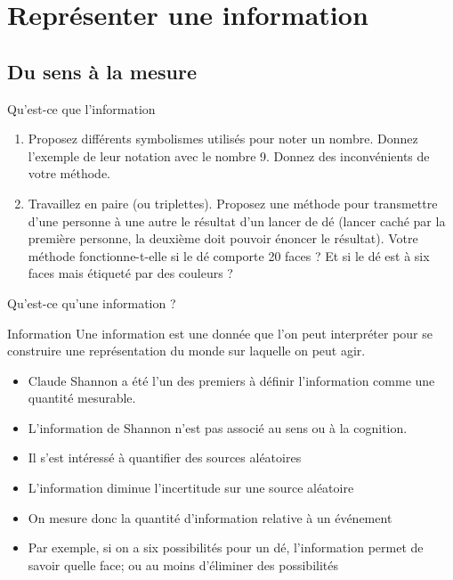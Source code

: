 \section{Représenter une information}
\subsection{Du sens à la mesure}
\begin{exercice}
  \begin{exercicelet}{Qu'est-ce que l'information}
    \begin{enumerate}
    \item Proposez différents symbolismes utilisés pour noter un
      nombre. Donnez l'exemple de leur notation avec le nombre 9. Donnez des
      inconvénients de votre méthode.
    \item Travaillez en paire (ou triplettes). Proposez une méthode pour
      transmettre d'une personne à une autre le résultat d'un lancer de dé
      (lancer caché par la première personne, la deuxième doit pouvoir énoncer
      le résultat). Votre méthode fonctionne-t-elle si le dé comporte 20
      faces ? Et si le dé est à six faces mais étiqueté par des couleurs ?
    \end{enumerate}
  \end{exercicelet}
\end{exercice}
\begin{frame}{Qu'est-ce qu'une information ?}
  \begin{block}{Information}
    Une information est une donnée que l'on peut interpréter pour se
    construire une représentation du monde sur laquelle on peut agir.
  \end{block}
  \begin{itemize}
  \item[\dialoginformation] Claude Shannon a été l'un des premiers à
    définir l'information comme une quantité mesurable.
  \item[\dialogwarning] L'information de Shannon n'est pas associé au
    sens ou à la cognition.
  \item Il s'est intéressé à quantifier des sources aléatoires
  \item L'information diminue l'incertitude sur une source aléatoire
  \item On mesure donc la quantité d'information relative à un événement
  \item Par exemple, si on a six possibilités pour un dé, l'information
    permet de savoir quelle face; ou au moins d'éliminer des
    possibilités
  \end{itemize}
\end{frame}
